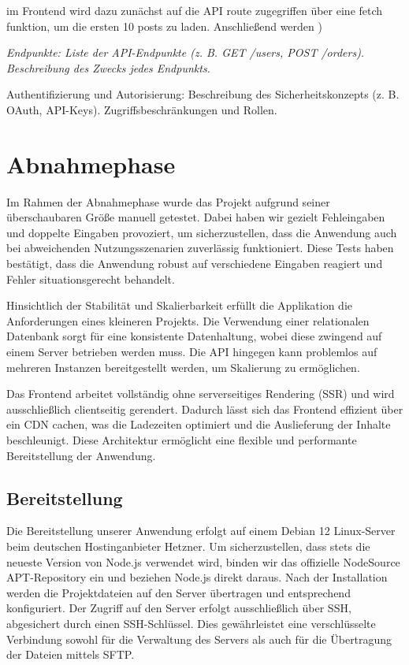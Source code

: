 \documentclass[a4paper,12pt]{article}
\begin{document}
 im Frontend wird dazu zunächst auf die API route zugegriffen über eine fetch funktion, um die ersten 10 posts zu laden. Anschließend werden
 )

\textit{Endpunkte: Liste der API-Endpunkte (z. B. GET /users, POST /orders).
Beschreibung des Zwecks jedes Endpunkts.}

Authentifizierung und Autorisierung: Beschreibung des Sicherheitskonzepts (z. B.
OAuth, API-Keys).  Zugriffsbeschränkungen und Rollen.

\newpage \section{Abnahmephase}
Im Rahmen der Abnahmephase wurde das Projekt aufgrund seiner überschaubaren Größe manuell getestet. Dabei haben wir gezielt Fehleingaben und doppelte Eingaben provoziert, um sicherzustellen, dass die Anwendung auch bei abweichenden Nutzungsszenarien zuverlässig funktioniert. Diese Tests haben bestätigt, dass die Anwendung robust auf verschiedene Eingaben reagiert und Fehler situationsgerecht behandelt.

Hinsichtlich der Stabilität und Skalierbarkeit erfüllt die Applikation die Anforderungen eines kleineren Projekts. Die Verwendung einer relationalen Datenbank sorgt für eine konsistente Datenhaltung, wobei diese zwingend auf einem Server betrieben werden muss. Die API hingegen kann problemlos auf mehreren Instanzen bereitgestellt werden, um Skalierung zu ermöglichen.

Das Frontend arbeitet vollständig ohne serverseitiges Rendering (SSR) und wird ausschließlich clientseitig gerendert. Dadurch lässt sich das Frontend effizient über ein CDN cachen, was die Ladezeiten optimiert und die Auslieferung der Inhalte beschleunigt. Diese Architektur ermöglicht eine flexible und performante Bereitstellung der Anwendung.

\subsection{Bereitstellung}
Die Bereitstellung unserer Anwendung erfolgt auf einem Debian 12 Linux-Server beim deutschen Hostinganbieter Hetzner. Um sicherzustellen, dass stets die neueste Version von Node.js verwendet wird, binden wir das offizielle NodeSource APT-Repository ein und beziehen Node.js direkt daraus. Nach der Installation werden die Projektdateien auf den Server übertragen und entsprechend konfiguriert. Der Zugriff auf den Server erfolgt ausschließlich über SSH, abgesichert durch einen SSH-Schlüssel. Dies gewährleistet eine verschlüsselte Verbindung sowohl für die Verwaltung des Servers als auch für die Übertragung der Dateien mittels SFTP.
\end{document}
